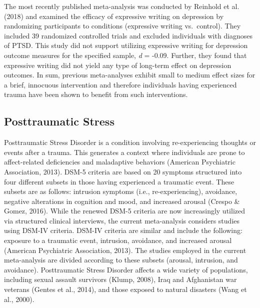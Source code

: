 \documentclass[,man]{apa6}
\begin{document}
The most recently published meta-analysis was conducted by Reinhold et al. (2018) and examined the efficacy of expressive writing on depression by randomizing participants to conditions (expressive writing vs.~control). They included 39 randomized controlled trials and excluded individuals with diagnoses of PTSD. This study did not support utilizing expressive writing for depression outcome measures for the specified sample, \emph{d} = -0.09. Further, they found that expressive writing did not yield any type of long-term effect on depression outcomes. In sum, previous meta-analyses exhibit small to medium effect sizes for a brief, innocuous intervention and therefore individuals having experienced trauma have been shown to benefit from such interventions.

\hypertarget{posttraumatic-stress}{%
\subsection{Posttraumatic Stress}\label{posttraumatic-stress}}

Posttraumatic Stress Disorder is a condition involving re-experiencing thoughts or events after a trauma. This generates a context where individuals are prone to affect-related deficiencies and maladaptive behaviors (American Psychiatric Association, 2013). DSM-5 criteria are based on 20 symptoms structured into four different subsets in those having experienced a traumatic event. These subsets are as follows: intrusion symptoms (i.e., re-experiencing), avoidance, negative alterations in cognition and mood, and increased arousal (Crespo \& Gomez, 2016). While the renewed DSM-5 criteria are now increasingly utilized via structured clinical interviews, the current meta-analysis considers studies using DSM-IV criteria. DSM-IV criteria are similar and include the following: exposure to a traumatic event, intrusion, avoidance, and increased arousal (American Psychiatric Association, 2013). The studies employed in the current meta-analysis are divided according to these subsets (arousal, intrusion, and avoidance). Posttraumatic Stress Disorder affects a wide variety of populations, including sexual assault survivors (Klump, 2008), Iraq and Afghanistan war veterans (Gentes et al., 2014), and those exposed to natural disasters (Wang et al., 2000).
\end{document}
